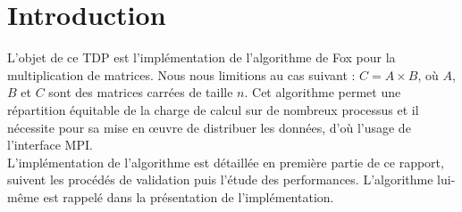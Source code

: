 \section*{Introduction}

L'objet de ce TDP est l'implémentation de l'algorithme de Fox pour la multiplication de matrices. Nous nous limitions au cas suivant : $C = A\times B$, où $A$, $B$ et $C$ sont des matrices carrées de taille $n$. Cet algorithme permet une répartition équitable de la charge de calcul sur de nombreux processus et il nécessite pour sa mise en \oe uvre de distribuer les données, d'où l'usage de l'interface MPI.\\

L'implémentation de l'algorithme est détaillée en première partie de ce rapport, suivent les procédés de validation puis l'étude des performances. L'algorithme lui-même est rappelé dans la présentation de l'implémentation.

\newpage
